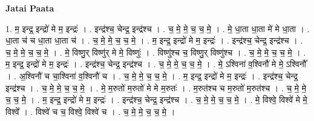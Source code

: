 \documentclass[17pt]{extarticle}
\begin{document}
\textbf{Jatai Paata} \newline

1. म॒ इन्द्र॒ इन्द्रो॑ मे म॒ इन्द्रः॑ । . इन्द्र॑श्च॒ चेन्द्र॒ इन्द्र॑श्च । . च॒ मे॒ मे॒ च॒ च॒ मे॒ । . मे॒ धा॒ता धा॒ता मे॑ मे धा॒ता । . धा॒ता च॑ च धा॒ता धा॒ता च॑ । . च॒ मे॒ मे॒ च॒ च॒ मे॒ । . म॒ इन्द्र॒ इन्द्रो॑ मे म॒ इन्द्रः॑ । . इन्द्र॑श्च॒ चेन्द्र॒ इन्द्र॑श्च । . च॒ मे॒ मे॒ च॒ च॒ मे॒ । . मे॒ विष्णु॒र् विष्णु॑र् मे मे॒ विष्णुः॑ । . विष्णु॑श्च च॒ विष्णु॒र् विष्णु॑श्च । . च॒ मे॒ मे॒ च॒ च॒ मे॒ । . म॒ इन्द्र॒ इन्द्रो॑ मे म॒ इन्द्रः॑ । . इन्द्र॑श्च॒ चेन्द्र॒ इन्द्र॑श्च । . च॒ मे॒ मे॒ च॒ च॒ मे॒ । . मे॒ ऽश्विना॑ व॒श्विनौ॑ मे मे॒ ऽश्विनौ᳚ । . अ॒श्विनौ॑ च चा॒श्विना॑ व॒श्विनौ॑ च । . च॒ मे॒ मे॒ च॒ च॒ मे॒ । . म॒ इन्द्र॒ इन्द्रो॑ मे म॒ इन्द्रः॑ । . इन्द्र॑श्च॒ चेन्द्र॒ इन्द्र॑श्च । . च॒ मे॒ मे॒ च॒ च॒ मे॒ । . मे॒ म॒रुतो॑ म॒रुतो॑ मे मे म॒रुतः॑ । . म॒रुत॑श्च च म॒रुतो॑ म॒रुत॑श्च । . च॒ मे॒ मे॒ च॒ च॒ मे॒ । . म॒ इन्द्र॒ इन्द्रो॑ मे म॒ इन्द्रः॑ । . इन्द्र॑श्च॒ चेन्द्र॒ इन्द्र॑श्च । . च॒ मे॒ मे॒ च॒ च॒ मे॒ । . मे॒ विश्वे॒ विश्वे॑ मे मे॒ विश्वे᳚ । . विश्वे॑ च च॒ विश्वे॒ विश्वे॑ च । . च॒ मे॒ मे॒ च॒ च॒ मे॒ । \newline
\end{document}

